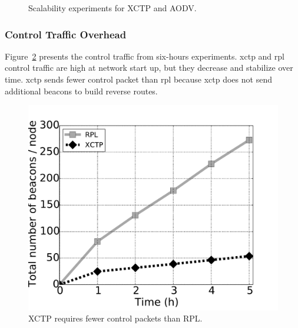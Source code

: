 \begin{figure}[!ht]
\centerline{
} \caption{Scalability experiments for XCTP and AODV.}
\label{fig:escalabilidade}
\end{figure}

\subsubsection{Control Traffic Overhead}
Figure~\ref{fig:beacons-xctp-vs-rpl} presents the control traffic from six-hours experiments. \ac{xctp} and \ac{rpl} control traffic are high at network start up, but they decrease and stabilize over time. \ac{xctp} sends fewer control packet than \ac{rpl} because \ac{xctp} does not send additional beacons to build reverse routes.

\begin{figure}[ht]
\centerline{
    \includegraphics[width=0.48\linewidth]{img/beacons-xctp-vs-rpl}
} \caption{XCTP requires fewer control packets than RPL.}
\label{fig:beacons-xctp-vs-rpl}
\end{figure}

